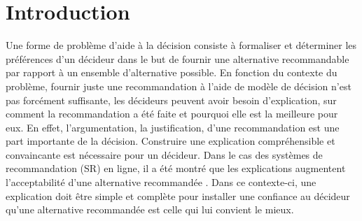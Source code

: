 \documentclass[a4paper, 11pt]{article}
\begin{document}


\newpage

\tableofcontents

\newpage

\section{Introduction}

Une forme de problème d'aide à la décision consiste à formaliser et déterminer les préférences d'un décideur dans le but de fournir une alternative recommandable par rapport à un ensemble d'alternative possible. En fonction  du contexte du problème, fournir juste une recommandation à l'aide de modèle de décision n'est pas forcément suffisante, les décideurs peuvent avoir besoin d'explication, sur comment la recommandation a été faite et pourquoi elle est la meilleure pour eux. En  effet, l'argumentation, la justification, d'une recommandation est une part importante de la décision. Construire une explication compréhensible et convaincante est nécessaire pour un décideur. Dans le cas des systèmes de recommandation (SR) en ligne, il a été montré que les explications augmentent l'acceptabilité d'une alternative recommandée \textcolor{blue}{\citep{PU2007542}}. Dans ce contexte-ci, une explication doit être simple et complète pour installer une confiance au décideur qu'une alternative recommandée est celle qui lui convient le mieux.
\end{document}
